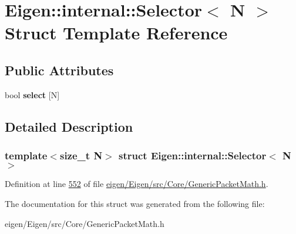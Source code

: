 \hypertarget{struct_eigen_1_1internal_1_1_selector}{}\section{Eigen\+:\+:internal\+:\+:Selector$<$ N $>$ Struct Template Reference}
\label{struct_eigen_1_1internal_1_1_selector}
\subsection*{Public Attributes}
\begin{DoxyCompactItemize}
\item 
\mbox{\label{struct_eigen_1_1internal_1_1_selector_aaca418056d13c7e83369911d3a411887}} 
bool {\bfseries select} \mbox{[}N\mbox{]}
\end{DoxyCompactItemize}


\subsection{Detailed Description}
\subsubsection*{template$<$size\+\_\+t N$>$\newline
struct Eigen\+::internal\+::\+Selector$<$ N $>$}



Definition at line \hyperlink{eigen_2_eigen_2src_2_core_2_generic_packet_math_8h_source_l00552}{552} of file \hyperlink{eigen_2_eigen_2src_2_core_2_generic_packet_math_8h_source}{eigen/\+Eigen/src/\+Core/\+Generic\+Packet\+Math.\+h}.



The documentation for this struct was generated from the following file\+:\begin{DoxyCompactItemize}
\item 
eigen/\+Eigen/src/\+Core/\+Generic\+Packet\+Math.\+h\end{DoxyCompactItemize}
